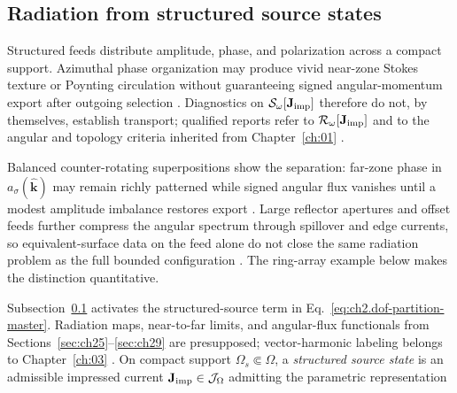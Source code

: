 \subsection{Radiation from structured source states}
\label{sec:ch2104}

Structured feeds distribute amplitude, phase, and polarization across a compact support. Azimuthal
phase organization may produce vivid near-zone Stokes texture or Poynting circulation without
guaranteeing signed angular-momentum export after outgoing selection \cite{belinfante1940,
stratton1941}. Diagnostics on $\mathcal{S}_\omega[\mathbf{J}_{\mathrm{imp}}]$ therefore do not, by themselves,
establish transport; qualified reports refer to $\mathcal{R}_\omega[\mathbf{J}_{\mathrm{imp}}]$ and to the angular
and topology criteria inherited from Chapter~\ref{ch:01} \cite{harrington2001,maxwell1873}.

Balanced counter-rotating superpositions show the separation: far-zone phase in
$a_\sigma(\widehat{\mathbf{k}})$ may remain richly patterned while signed angular flux vanishes
until a modest amplitude imbalance restores export \cite{belinfante1940}. Large reflector apertures
and offset feeds further compress the angular spectrum through spillover and edge currents, so
equivalent-surface data on the feed alone do not close the same radiation problem as the full
bounded configuration \cite{collin2001,stratton1941}. The ring-array example below makes the
distinction quantitative.

Subsection~\ref{sec:ch2104} activates the structured-source term in
Eq.~\eqref{eq:ch2.dof-partition-master}. Radiation maps, near-to-far limits, and angular-flux
functionals from Sections~\ref{sec:ch25}--\ref{sec:ch29} are presupposed; vector-harmonic
labeling belongs to Chapter~\ref{ch:03} \cite{stratton1941}. On compact support
\(\Omega_s\Subset\Omega\), a \emph{structured source state} is an admissible impressed current
\(\mathbf{J}_{\mathrm{imp}}\in\mathcal{J}_\Omega\) admitting the parametric representation

